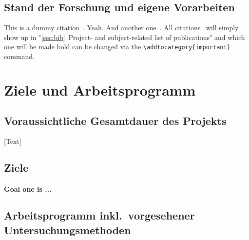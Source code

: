 \documentclass[ngerman]{scrartcl}
\begin{document}
\subsection*{Stand der Forschung und eigene Vorarbeiten}

This is a dummy citation~\cite{lamkiewicz2024ribap}. Yeah. And another one~\cite{assmann2025augmentation}. All citations~\cite{fuchs2025varvamp,galeone2025decoding,raharinirina2025sars} will simply show up in "\ref{sec:bib}~Project- and subject-related list of publications" and which one will be made bold can be changed via the \verb=\addtocategory{important}= command.

\lipsum[1]

\section{Ziele und Arbeitsprogramm}

\subsection{Voraussichtliche Gesamtdauer des Projekts}
[Text]

\subsection{Ziele}
\let\oldpara=\theparagraph
\addtocounter{secnumdepth}{1}
\renewcommand{\theparagraph}{Ziel \arabic{paragraph}}

\paragraph{\textnormal{Goal one is ...}}

\subsection{Arbeitsprogramm inkl.\ vorgesehener Untersuchungsmethoden}
\end{document}
